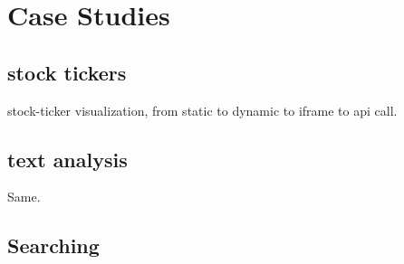 \section{Case Studies}

\subsection{stock tickers}

stock-ticker visualization, from static to dynamic to iframe to api
call.

\subsection{text analysis}

Same.

\subsection{Searching}





%
